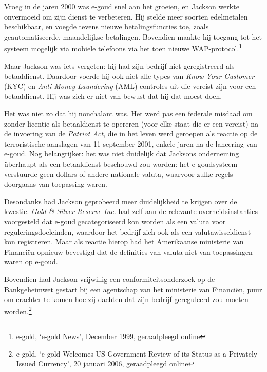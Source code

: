 \documentclass[
  a5paper,
  smalldemyvopaper,11pt,twoside,onecolumn,openright,extrafontsizes]{memoir}
\begin{document}

Vroeg in de jaren 2000 was e-goud snel aan het groeien, en Jackson
werkte onvermoeid om zijn dienst te verbeteren. Hij stelde meer soorten
edelmetalen beschikbaar, en voegde tevens nieuwe betalingsfuncties toe,
zoals geautomatiseerde, maandelijkse betalingen. Bovendien maakte hij
toegang tot het systeem mogelijk via mobiele telefoons via het toen
nieuwe WAP-protocol.\footnote{\hspace{0pt}e-gold, `e-gold News',
  December 1999, geraadpleegd
  \href{https://web.archive.org/web/20001209053900fw_/http://www.e-gold.com/news.html.}{online}}

Maar Jackson was iets vergeten: hij had zijn bedrijf niet geregistreerd
als betaaldienst. Daardoor voerde hij ook niet alle types van
\emph{Know-Your-Customer} (KYC) en \emph{Anti-Money Laundering} (AML)
controles uit die vereist zijn voor een betaaldienst. Hij was zich er
niet van bewust dat hij dat moest doen.

Het was niet zo dat hij nonchalant was. Het werd pas een federale
misdaad om zonder licentie als betaaldienst te opereren (voor elke staat
die er een vereist) na de invoering van de \emph{Patriot Act}, die in
het leven werd geroepen als reactie op de terroristische aanslagen van
11 september 2001, enkele jaren na de lancering van e-goud. Nog
belangrijker: het was niet duidelijk dat Jacksons onderneming überhaupt
als een betaaldienst beschouwd zou worden: het e-goudsysteem verstuurde
geen dollars of andere nationale valuta, waarvoor zulke regels doorgaans
van toepassing waren.

Desondanks had Jackson geprobeerd meer duidelijkheid te krijgen over de
kwestie. \emph{Gold \& Silver Reserve Inc.} had zelf aan de relevante
overheidsinstanties voorgesteld dat e-goud gecategoriseerd kon worden
als een valuta voor reguleringsdoeleinden, waardoor het bedrijf zich ook
als een valutawisseldienst kon registreren. Maar als reactie hierop had
het Amerikaanse ministerie van Financiën opnieuw bevestigd dat de
definities van valuta niet van toepassingen waren op e-goud.

Bovendien had Jackson vrijwillig een conformiteitsonderzoek op de
Bankgeheimwet gestart bij een agentschap van het ministerie van
Financiën, puur om erachter te komen hoe zij dachten dat zijn bedrijf
gereguleerd zou moeten worden.\footnote{\hspace{0pt}e-gold, `e-gold
  Welcomes US Government Review of its Status as a Privately Issued
  Currency', 20 januari 2006, geraadpleegd
  \href{https://web.archive.org/web/20060304203618if_/http://www.e-gold.com/letter2.html.}{online}}
\end{document}
